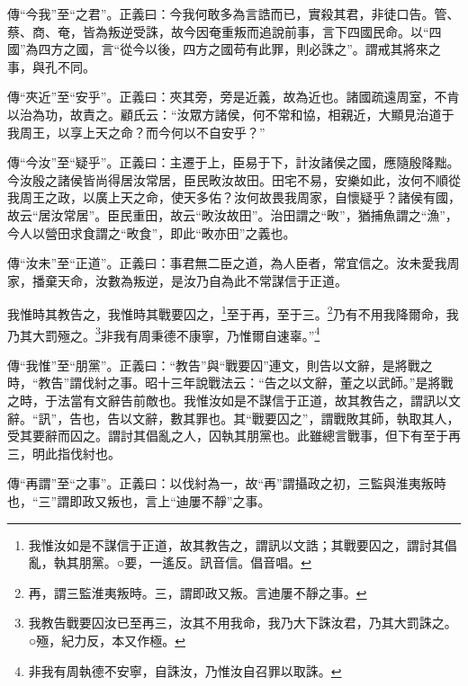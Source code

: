 {\noindent\zhuan{}\fzbyks 傳“今我”至“之君”。正義曰：今我何敢多為言誥而已，實殺其君，非徒口告。管、蔡、商、奄，皆為叛逆受誅，故今因奄重叛而追說前事，言下四國民命。以“四國”為四方之國，言“從今以後，四方之國苟有此罪，則必誅之”。謂戒其將來之事，與孔不同。 \par}

{\noindent\zhuan{}\fzbyks 傳“夾近”至“安乎”。正義曰：夾其旁，旁是近義，故為近也。諸國疏遠周室，不肯以治為功，故責之。顧氏云：“汝眾方諸侯，何不常和協，相親近，大顯見治道于我周王，以享上天之命？而今何以不自安乎？” \par}

{\noindent\zhuan{}\fzbyks 傳“今汝”至“疑乎”。正義曰：主遷于上，臣易于下，計汝諸侯之國，應隨殷降黜。今汝殷之諸侯皆尚得居汝常居，臣民畋汝故田。田宅不易，安樂如此，汝何不順從我周王之政，以廣上天之命，使天多佑？汝何故畏我周家，自懷疑乎？諸侯有國，故云“居汝常居”。臣民重田，故云“畋汝故田”。治田謂之“畋”，猶捕魚謂之“漁”，今人以營田求食謂之“畋食”，即此“畋亦田”之義也。 \par}

{\noindent\zhuan{}\fzbyks 傳“汝未”至“正道”。正義曰：事君無二臣之道，為人臣者，常宜信之。汝未愛我周家，播棄天命，汝數為叛逆，是汝乃自為此不常謀信于正道。 \par}

我惟時其教告之，我惟時其戰要囚之，\footnote{我惟汝如是不謀信于正道，故其教告之，謂訊以文誥；其戰要囚之，謂討其倡亂，執其朋黨。○要，一遙反。訊音信。倡音唱。}至于再，至于三。\footnote{再，謂三監淮夷叛時。三，謂即政又叛。言迪屢不靜之事。}乃有不用我降爾命，我乃其大罰殛之。\footnote{我教告戰要囚汝已至再三，汝其不用我命，我乃大下誅汝君，乃其大罰誅之。○殛，紀力反，本又作極。}非我有周秉德不康寧，乃惟爾自速辜。”\footnote{非我有周執德不安寧，自誅汝，乃惟汝自召罪以取誅。}

{\noindent\zhuan{}\fzbyks 傳“我惟”至“朋黨”。正義曰：“教告”與“戰要囚”連文，則告以文辭，是將戰之時，“教告”謂伐紂之事。昭十三年說戰法云：“告之以文辭，董之以武師。”是將戰之時，于法當有文辭告前敵也。我惟汝如是不謀信于正道，故其教告之，謂訊以文辭。“訊”，告也，告以文辭，數其罪也。其“戰要囚之”，謂戰敗其師，執取其人，受其要辭而囚之。謂討其倡亂之人，囚執其朋黨也。此雖總言戰事，但下有至于再三，明此指伐紂也。 \par}

{\noindent\zhuan{}\fzbyks 傳“再謂”至“之事”。正義曰：以伐紂為一，故“再”謂攝政之初，三監與淮夷叛時也，“三”謂即政又叛也，言上“迪屢不靜”之事。 \par}

